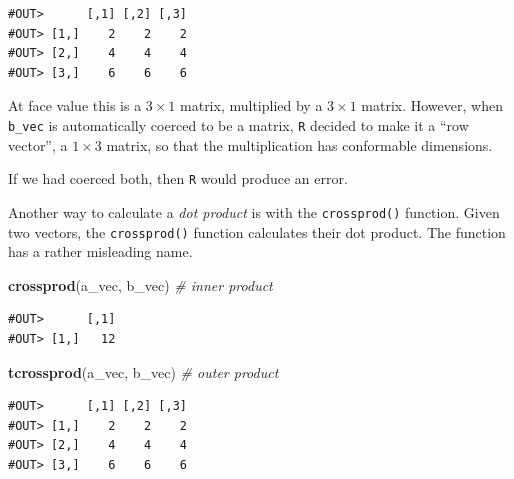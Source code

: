 \documentclass[]{book}
\newenvironment{Shaded}{\begin{snugshade}}{\end{snugshade}}
\newcommand{\KeywordTok}[1]{\textcolor[rgb]{0.13,0.29,0.53}{\textbf{#1}}}
\newcommand{\StringTok}[1]{\textcolor[rgb]{0.31,0.60,0.02}{#1}}
\newcommand{\CommentTok}[1]{\textcolor[rgb]{0.56,0.35,0.01}{\textit{#1}}}
\newcommand{\OperatorTok}[1]{\textcolor[rgb]{0.81,0.36,0.00}{\textbf{#1}}}
\newcommand{\NormalTok}[1]{#1}
\theoremstyle{definition}
\theoremstyle{definition}
\theoremstyle{definition}
\theoremstyle{remark}
\begin{document}
\begin{Shaded}
\end{Shaded}

\begin{verbatim}
#OUT>      [,1] [,2] [,3]
#OUT> [1,]    2    2    2
#OUT> [2,]    4    4    4
#OUT> [3,]    6    6    6
\end{verbatim}

At face value this is a \(3 \times 1\) matrix, multiplied by a
\(3 \times 1\) matrix. However, when \texttt{b\_vec} is automatically
coerced to be a matrix, \texttt{R} decided to make it a ``row vector'',
a \(1 \times 3\) matrix, so that the multiplication has conformable
dimensions.

If we had coerced both, then \texttt{R} would produce an error.

\begin{Shaded}
\end{Shaded}

Another way to calculate a \emph{dot product} is with the
\texttt{crossprod()} function. Given two vectors, the
\texttt{crossprod()} function calculates their dot product. The function
has a rather misleading name.

\begin{Shaded}
\begin{Highlighting}[]
\KeywordTok{crossprod}\NormalTok{(a_vec, b_vec)  }\CommentTok{# inner product}
\end{Highlighting}
\end{Shaded}

\begin{verbatim}
#OUT>      [,1]
#OUT> [1,]   12
\end{verbatim}

\begin{Shaded}
\begin{Highlighting}[]
\KeywordTok{tcrossprod}\NormalTok{(a_vec, b_vec)  }\CommentTok{# outer product}
\end{Highlighting}
\end{Shaded}

\begin{verbatim}
#OUT>      [,1] [,2] [,3]
#OUT> [1,]    2    2    2
#OUT> [2,]    4    4    4
#OUT> [3,]    6    6    6
\end{verbatim}
\end{document}
